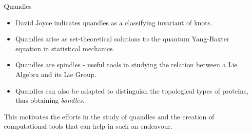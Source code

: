 \begin{frame}{Quandles}
    \begin{itemize}
        \item David Joyce indicates quandles as a classifying invariant of knots.
        \item Quandles arise as set-theoretical solutions to the quantum Yang-Baxter equation in statistical mechanics. 
        \item Quandles are spindles - useful tools in studying the relation between a Lie Algebra and its Lie Group. \item Quandles can also be adapted to distinguish the topological types of proteins, thus obtaining \emph{bondles}. 
    \end{itemize}
    This motivates the efforts in the study of quandles and the creation of computational tools that can help in such an endeavour.
\end{frame}
